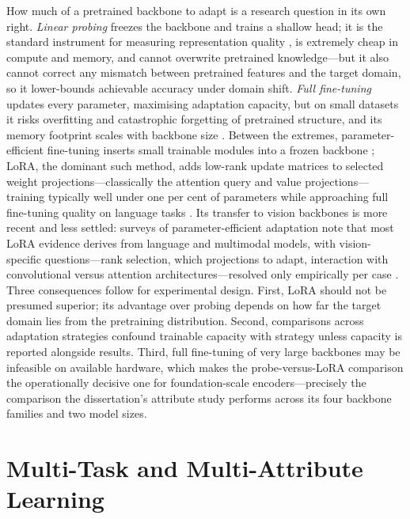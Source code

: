 How much of a pretrained backbone to adapt is a research question in its own right. \emph{Linear probing} freezes the backbone and trains a shallow head; it is the standard instrument for measuring representation quality \citep{chen2020simple,oquab2024dinov2}, is extremely cheap in compute and memory, and cannot overwrite pretrained knowledge---but it also cannot correct any mismatch between pretrained features and the target domain, so it lower-bounds achievable accuracy under domain shift. \emph{Full fine-tuning} updates every parameter, maximising adaptation capacity, but on small datasets it risks overfitting and catastrophic forgetting of pretrained structure, and its memory footprint scales with backbone size \citep{yosinski2014transferable,he2019rethinking}. Between the extremes, parameter-efficient fine-tuning inserts small trainable modules into a frozen backbone \citep{houlsby2019parameter}; LoRA, the dominant such method, adds low-rank update matrices to selected weight projections---classically the attention query and value projections---training typically well under one per cent of parameters while approaching full fine-tuning quality on language tasks \citep{hu2022lora}. Its transfer to vision backbones is more recent and less settled: surveys of parameter-efficient adaptation note that most LoRA evidence derives from language and multimodal models, with vision-specific questions---rank selection, which projections to adapt, interaction with convolutional versus attention architectures---resolved only empirically per case \citep{han2024parameter}. Three consequences follow for experimental design. First, LoRA should not be presumed superior; its advantage over probing depends on how far the target domain lies from the pretraining distribution. Second, comparisons across adaptation strategies confound trainable capacity with strategy unless capacity is reported alongside results. Third, full fine-tuning of very large backbones may be infeasible on available hardware, which makes the probe-versus-LoRA comparison the operationally decisive one for foundation-scale encoders---precisely the comparison the dissertation's attribute study performs across its four backbone families and two model sizes.

\section{Multi-Task and Multi-Attribute Learning}
\label{sec:lr-multitask}

